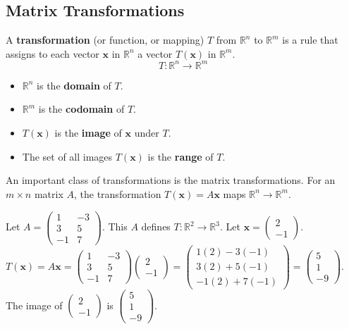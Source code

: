 \subsection{Matrix Transformations}
A \textbf{transformation} (or function, or mapping) $T$ from $\mathbb{R}^n$ to $\mathbb{R}^m$ is a rule that assigns to each vector $\mathbf{x}$ in $\mathbb{R}^n$ a vector $T(\mathbf{x})$ in $\mathbb{R}^m$.
\[ T: \mathbb{R}^n \to \mathbb{R}^m \]
\begin{itemize}
    \item $\mathbb{R}^n$ is the \textbf{domain} of $T$.
    \item $\mathbb{R}^m$ is the \textbf{codomain} of $T$.
    \item $T(\mathbf{x})$ is the \textbf{image} of $\mathbf{x}$ under $T$.
    \item The set of all images $T(\mathbf{x})$ is the \textbf{range} of $T$.
\end{itemize}

An important class of transformations is the matrix transformations.
For an $m \times n$ matrix $A$, the transformation $T(\mathbf{x}) = A\mathbf{x}$ maps $\mathbb{R}^n \to \mathbb{R}^m$.

\begin{example}
Let $A = \begin{pmatrix} 1 & -3 \\ 3 & 5 \\ -1 & 7 \end{pmatrix}$. This $A$ defines $T: \mathbb{R}^2 \to \mathbb{R}^3$.
Let $\mathbf{x} = \begin{pmatrix} 2 \\ -1 \end{pmatrix}$.
$T(\mathbf{x}) = A\mathbf{x} = \begin{pmatrix} 1 & -3 \\ 3 & 5 \\ -1 & 7 \end{pmatrix} \begin{pmatrix} 2 \\ -1 \end{pmatrix} = \begin{pmatrix} 1(2) - 3(-1) \\ 3(2) + 5(-1) \\ -1(2) + 7(-1) \end{pmatrix} = \begin{pmatrix} 5 \\ 1 \\ -9 \end{pmatrix}$.
The image of $\begin{pmatrix} 2 \\ -1 \end{pmatrix}$ is $\begin{pmatrix} 5 \\ 1 \\ -9 \end{pmatrix}$.
\end{example}


